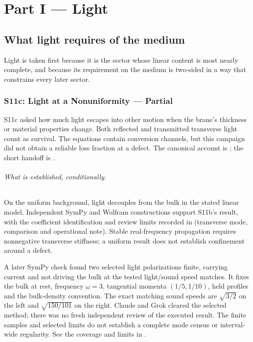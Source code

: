 \part{Part I --- Light}

\chapter{What light requires of the medium}

Light is taken first because it is the sector whose linear content is most
nearly complete, and because its requirement on the medium is two-sided in a way
that constrains every later sector.









\section{S11c: Light at a Nonuniformity --- Partial}
\label{step:S11c}

S11c asked how much light escapes into other motion when the brane's
thickness or material properties change. Both reflected and transmitted
transverse light count as survival. The equations contain conversion
channels, but this campaign did not obtain a reliable loss fraction at a
defect. The canonical account is
; the short handoff is
.

\paragraph{What is established, conditionally.}
On the uniform background, light decouples from the bulk in the stated
linear model. Independent SymPy and Wolfram constructions support S11b's
result, with the coefficient identification and review limits recorded in
 (transverse mode, comparison
and operational note). Stable real-frequency propagation requires
nonnegative transverse stiffness; a uniform result does not establish
confinement around a defect.

A later SymPy check found two selected light polarizations finite, carrying
current and not driving the bulk at the tested light/sound speed matches.
It fixes the bulk at rest, frequency \(\omega=3\), tangential momenta
\((1/5,1/10)\), held profiles and the bulk-density convention. The exact
matching sound speeds are \(\sqrt{3/2}\) on the left and
\(\sqrt{150/101}\) on the right. Claude and Grok cleared the selected method;
there was no fresh independent review of the executed result. The finite
samples and selected limits do not establish a complete mode census or
interval-wide regularity. See the coverage and limits in
.

